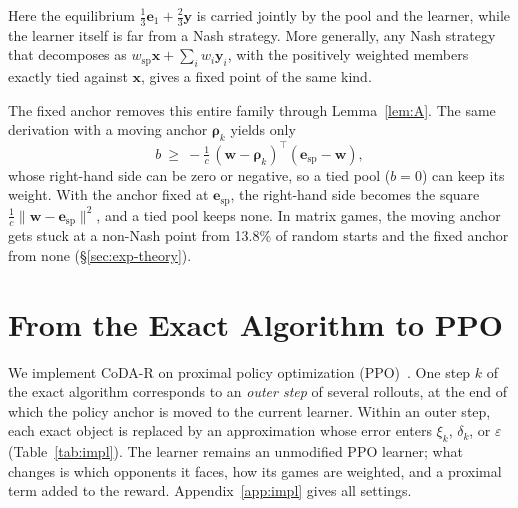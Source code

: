 \documentclass{article}
\theoremstyle{plain}
\theoremstyle{remark}
\newcommand{\bx}{{\bm{x}}}
\newcommand{\by}{{\bm{y}}}
\newcommand{\bw}{{\bm{w}}}
\newcommand{\be}{{\bm{e}}}
\newcommand{\brho}{{\bm{\rho}}}
\newcommand{\esp}{\be_{\mathrm{sp}}}
\newcommand{\wsp}{w_{\mathrm{sp}}}
\newcommand{\codar}{CoDA-R}
\begin{document}
Here the equilibrium $\tfrac13\be_1+\tfrac23\by$ is carried jointly by the pool and the learner, while the learner itself is far from a Nash strategy. More generally, any Nash strategy that decomposes as $\wsp\bx+\sum_iw_i\by_i$, with the positively weighted members exactly tied against $\bx$, gives a fixed point of the same kind.

The fixed anchor removes this entire family through Lemma~\ref{lem:A}. The same derivation with a moving anchor $\brho_k$ yields only
\[
b\ \ge\ -\tfrac1c\,(\bw-\brho_k)^\top(\esp-\bw),
\]
whose right-hand side can be zero or negative, so a tied pool ($b=0$) can keep its weight. With the anchor fixed at $\esp$, the right-hand side becomes the square $\tfrac1c\|\bw-\esp\|^2$, and a tied pool keeps none. In matrix games, the moving anchor gets stuck at a non-Nash point from 13.8\% of random starts and the fixed anchor from none (\S\ref{sec:exp-theory}).

\section{From the Exact Algorithm to PPO}
\label{sec:impl}

We implement \codar{} on proximal policy optimization (PPO)~\citep{schulman2017ppo}. One step $k$ of the exact algorithm corresponds to an \emph{outer step} of several rollouts, at the end of which the policy anchor is moved to the current learner. Within an outer step, each exact object is replaced by an approximation whose error enters $\xi_k$, $\delta_k$, or $\varepsilon$ (Table~\ref{tab:impl}). The learner remains an unmodified PPO learner; what changes is which opponents it faces, how its games are weighted, and a proximal term added to the reward. Appendix~\ref{app:impl} gives all settings.
\end{document}

